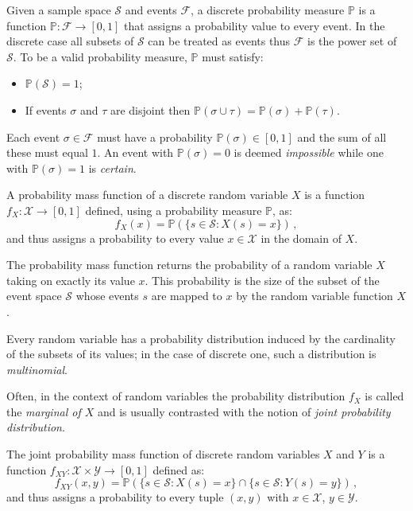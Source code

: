 \begin{definition} \label{def:probability-measure}
	Given a sample space $\mathcal{S}$ and events $\mathcal{F}$, a discrete probability measure $\mathbb{P}$ is a function $\mathbb{P}: \mathcal{F} \rightarrow [0,1]$ that assigns a probability value to every event. 
	In the discrete case all subsets of $\mathcal{S}$ can be treated as events thus $\mathcal{F}$ is the power set of $\mathcal{S}$.
To be a valid probability measure, $\mathbb{P}$ must satisfy:
\begin{itemize}
	\item $\mathbb{P}(\mathcal{S}) = 1$;
	\item If events $\sigma$ and $\tau$ are disjoint then $\mathbb{P}(\sigma \cup \tau)=\mathbb{P}(\sigma)+\mathbb{P}(\tau)$.
\end{itemize}
\end{definition}
Each event $\sigma \in \mathcal{F}$ must have a probability $\mathbb{P}(\sigma) \in [0,1]$ and the sum of all these must equal $1$. 
An event with $\mathbb{P}(\sigma) = 0$ is deemed \textit{impossible} while one with $\mathbb{P}(\sigma) = 1$ is \textit{certain}.

\begin{definition}\label{def:mass-function}
	A probability mass function of a discrete random variable $X$ is a function $f_X: \mathcal{X} \rightarrow [0,1]$ defined, using a probability measure $\mathbb{P}$, as:
\begin{equation*}
	f_X(x) = \mathbb{P}(\{s \in \mathcal{S} : X(s)=x\}) \,,
\end{equation*}
and thus assigns a probability to every value $x \in \mathcal{X}$ in the domain of $X$.
\end{definition}
The probability mass function returns the probability of a random variable $X$ taking on exactly its value $x$.
This probability is the size of the subset of the event space $\mathcal{S}$ whose events $s$ are mapped to $x$ by the random variable function $X$.

Every random variable has a probability distribution induced by the cardinality of the subsets of its values; in the case of discrete one, such a distribution is \textit{multinomial}.

Often, in the context of random variables the probability distribution $f_X$ is called the \textit{marginal of $X$} and is usually contrasted with the notion of \textit{joint probability distribution}.
\begin{definition}
	The joint probability mass function of discrete random variables $X$ and $Y$ is a function $f_{XY} : \mathcal{X} \times \mathcal{Y} \rightarrow [0,1]$ defined as:
	\begin{equation*}
		f_{XY}(x,y) = \mathbb{P}( \{s \in \mathcal{S} : X(s)=x \} \cap \{ s \in \mathcal{S} : Y(s)=y\} ) \,,
	\end{equation*}
	and thus assigns a probability to every tuple $(x,y)$ with $x \in \mathcal{X}$, $y \in \mathcal{Y}$.
\end{definition}

